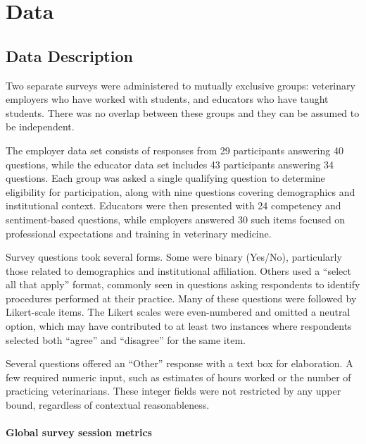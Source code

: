 \documentclass[
  11pt,
  letterpaper,
  DIV=11,
  numbers=noendperiod]{scrartcl}
\let\oldparagraph\paragraph
\renewcommand{\paragraph}[1]{\oldparagraph{#1}\mbox{}}
\numberwithin{figure}{section}
\begin{document}
\hypertarget{data}{%
\section{Data}\label{data}}

\hypertarget{data-description}{%
\subsection{Data Description}\label{data-description}}

Two separate surveys were administered to mutually exclusive groups:
veterinary employers who have worked with students, and educators who
have taught students. There was no overlap between these groups and they
can be assumed to be independent.

The employer data set consists of responses from 29 participants
answering 40 questions, while the educator data set includes 43
participants answering 34 questions. Each group was asked a single
qualifying question to determine eligibility for participation, along
with nine questions covering demographics and institutional context.
Educators were then presented with 24 competency and sentiment-based
questions, while employers answered 30 such items focused on
professional expectations and training in veterinary medicine.

Survey questions took several forms. Some were binary (Yes/No),
particularly those related to demographics and institutional
affiliation. Others used a ``select all that apply'' format, commonly
seen in questions asking respondents to identify procedures performed at
their practice. Many of these questions were followed by Likert-scale
items. The Likert scales were even-numbered and omitted a neutral
option, which may have contributed to at least two instances where
respondents selected both ``agree'' and ``disagree'' for the same item.

Several questions offered an ``Other'' response with a text box for
elaboration. A few required numeric input, such as estimates of hours
worked or the number of practicing veterinarians. These integer fields
were not restricted by any upper bound, regardless of contextual
reasonableness.

\hypertarget{global-survey-session-metrics}{%
\paragraph{Global survey session
metrics}\label{global-survey-session-metrics}}
\end{document}
